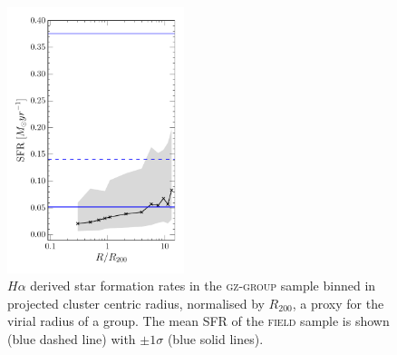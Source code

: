 \documentclass[useAMS,usenatbib]{mn2e}
\begin{document}
\begin{figure}
\includegraphics[width=0.46\textwidth]{sfr_trend_with_log_radius_field_matched_blue_hlines_gomez_03_rv_not_r200.pdf}
\caption{$H\alpha$ derived star formation rates in the \textsc{gz-group} sample binned in projected cluster centric radius, normalised by $R_{200}$, a proxy for the virial radius of a group. The mean SFR of the \textsc{field} sample is shown (blue dashed line) with $\pm1\sigma$ (blue solid lines).  }
\label{fig:sfrradius}
\end{figure}
\end{document}

